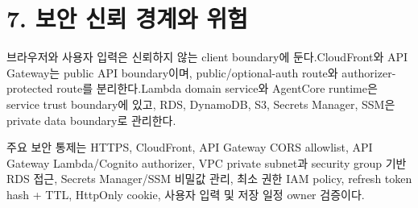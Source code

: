 \documentclass[12pt,a4paper]{article}
\newcommand{\DocNeedspace}[1]{\par\ifdim\dimexpr\pagegoal-\pagetotal\relax<#1\newpage\fi}
\newcommand{\TocNoChildTight}{\vspace{-0.28em}}
\begin{document}
\newpage

\DocNeedspace{10\baselineskip}
\section*{7. 보안 신뢰 경계와 위험}
\addtocontents{toc}{\protect\TocNoChildTight}


\DocNeedspace{3\baselineskip}
브라우저와 사용자 입력은 신뢰하지 않는 client boundary에 둔다.\newline CloudFront와 API Gateway는 public API boundary이며, public/optional-auth route와 authorizer-protected route를 분리한다.\newline Lambda domain service와 AgentCore runtime은 service trust boundary에 있고, RDS, DynamoDB, S3, Secrets Manager, SSM은 private data boundary로 관리한다.


\DocNeedspace{3\baselineskip}
주요 보안 통제는 HTTPS, CloudFront, API Gateway CORS allowlist, API Gateway Lambda/Cognito authorizer, VPC private subnet과 security group 기반 RDS 접근, Secrets Manager/SSM 비밀값 관리, 최소 권한 IAM policy, refresh token hash + TTL, HttpOnly cookie, 사용자 입력 및 저장 일정 owner 검증이다.
\end{document}
